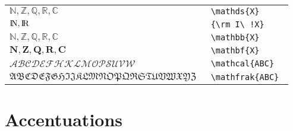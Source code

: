 \documentclass{report}
\begin{document}
\begin{tabular}{ll}



$ \mathds{N}, \mathds{Z}, \mathds{Q}, \mathds{R}, \mathds{C} $
&
\texttt{
\textbackslash{}mathds\{X\}
}
\\

$ {\rm I\!N}, {\rm I\!R}  $
&
\texttt{
\{\textbackslash{}rm I\textbackslash{}\!\! !X\}
}
\\

$ \mathbb{N}, \mathbb{Z}, \mathbb{Q}, \mathbb{R}, \mathbb{C} $
&
\texttt{
\textbackslash{}mathbb\{X\}
}
\\	

$ \mathbf{N}, \mathbf{Z}, \mathbf{Q}, \mathbf{R}, \mathbf{C} $
&
\texttt{
\textbackslash{}mathbf\{X\}
}
\\

$ \mathcal{ABCDEFHKLMOPSUVW} $
&
\texttt{
\textbackslash{}mathcal\{ABC\}
}
\\

$ \mathfrak{ABCDEFGHIJKLMNOPQRSTUVWXYZ} $
&
\texttt{
\textbackslash{}mathfrak\{ABC\}
}
\\

\end{tabular}


\section*{Accentuations}  %
\end{document}
